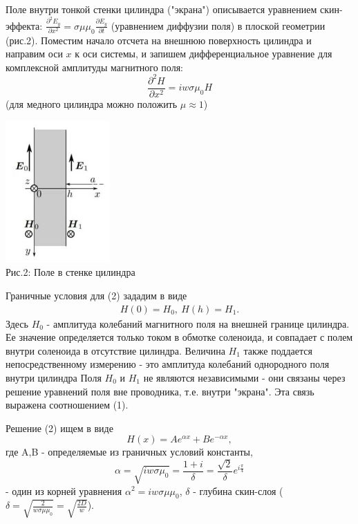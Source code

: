 \documentclass[a4paper,12pt]{report}
\begin{document}
Поле внутри тонкой стенки цилиндра ("экрана") описывается уравнением скин-эффекта: \( \frac{\partial^2 E_{y}}{\partial x^2}=\sigma\mu\mu_{0}\frac{\partial E_{y}}{\partial t}\) (уравнением диффузии поля) в плоской геометрии (рис.2). Поместим начало отсчета на внешнюю поверхность цилиндра и направим оси $x$ к оси системы, и запишем дифференциальное уравнение для комплексной амплитуды магнитного поля:
\begin{equation}
    \frac{\partial^2 H}{\partial x^2} = iw\sigma\mu_{0}H
\end{equation}
(для медного цилиндра можно положить \(\mu\approx 1\))
\begin{center}
	\includegraphics[width=0.3\textwidth]{рис2.jpg}\\
	\caption{Рис.2: Поле в стенке цилиндра}
\end{center}
Граничные условия для (2) зададим в виде
\begin{gather}
    H(0)=H_{0},\
    H(h)=H_{1}.
\end{gather}
Здесь $H_{0}$ - амплитуда колебаний магнитного поля на внешней границе цилиндра. Ее значение определяется только током в обмотке соленоида, и совпадает с полем внутри соленоида в отсутствие цилиндра. Величина $H_{1}$ также поддается непосредственному измерению - это амплитуда колебаний однородного поля внутри цилиндра Поля $H_{0}$ и $H_{1}$ не являются независимыми - они связаны через решение уравнений поля вне проводника, т.е. внутри "экрана". Эта связь выражена соотношением (1).

Решение (2) ищем в виде
\begin{equation}
    H(x) = Ae^{\alpha x} + Be^{-\alpha x},
\end{equation}
где A,B - определяемые из граничных условий константы,
\begin{equation}
    \alpha = \sqrt{iw\sigma\mu_{0}} = \frac{1+i}{\delta}=\frac{\sqrt{2}}{\delta}e^{i\frac{\pi}{4}}
\end{equation}
- один из корней уравнения \(\alpha^2 = iw\sigma\mu\mu_{0}\), $\delta$ - глубина скин-слоя (\(\delta=\sqrt{\frac{2}{w\sigma\mu\mu_{0}}}=\sqrt{\frac{2D}{w}}\)).
\end{document}
